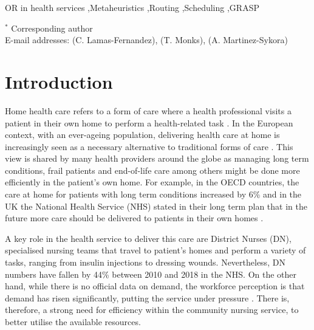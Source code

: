 \documentclass[a4paper,11pt]{elsarticle}
\begin{document}
\begin{frontmatter}
\begin{keyword}
OR in health services \sep Metaheuristics \sep Routing \sep Scheduling \sep GRASP


\end{keyword}


\end{frontmatter}

{\footnotesize
\noindent $^*$ Corresponding author\\
\noindent E-mail addresses:  (C. Lamas-Fernandez),  (T. Monks),  (A. Martinez-Sykora)
}

\newpage

\section{Introduction}\label{seq:intro}

Home health care refers to a form of care where a health professional visits a patient in their own home to perform a health-related task \citep{Cisse2017}. In the European context, with an ever-ageing population, delivering health care at home is increasingly seen as a necessary alternative to traditional forms of care \citep{tarricone2008home}.
This view is shared by many health providers around the globe as managing long term conditions, frail patients and end-of-life care among others might be done more efficiently in the patient's own home. For example, in the OECD countries, the care at home for patients with long term conditions increased by 6\% \citep{OECDHealthataGlance2019} and in the UK the National Health Service (NHS) stated in their long term plan that in the future more care should be delivered to patients in their own homes \cite{england2019nhs}.

A key role in the health service to deliver this care are District Nurses (DN), specialised nursing teams that travel to patient's homes and perform a variety of tasks, ranging from insulin injections to dressing wounds. Nevertheless, DN numbers have fallen by 44\% \cite{NHSProviders2018} between 2010 and 2018 in the NHS. On the other hand, while there is no official data on demand, the workforce perception is that demand has risen significantly, putting the service under pressure \citep{robertson2017understanding}. There is, therefore, a strong need for efficiency within the community nursing service, to better utilise the available resources.
\end{document}
